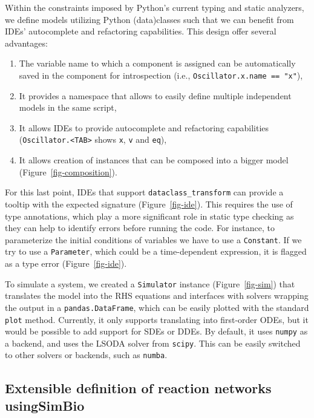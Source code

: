 \documentclass[namedate,numsec,webpdf,modern,large]{oup-authoring-template}
\theoremstyle{thmstyleone}%
\theoremstyle{thmstyletwo}%
\theoremstyle{thmstylethree}%
\begin{document}
Within the constraints imposed by Python's current typing and static analyzers,
we define models utilizing Python (data)classes
such that we can benefit from \acp{IDE}' autocomplete and refactoring capabilities.
This design offer several advantages:

\begin{enumerate}
\item
  The variable name to which a component is assigned can be automatically saved in the component for introspection
  (i.e., \texttt{Oscillator.x.name\ ==\ "x"}),
\item
  It provides a namespace that allows to easily define multiple independent models in the same script,
\item
  It allows \acp{IDE} to provide autocomplete and refactoring capabilities
  (\texttt{Oscillator.\textless{}TAB\textgreater{}} shows \texttt{x}, \texttt{v} and \texttt{eq}),
\item
  It allows creation of instances that can be composed into a bigger model (Figure~\ref{fig-composition}).
\end{enumerate}

For this last point,
\acp{IDE} that support \texttt{dataclass\_transform} \citep{debontePEP681Data2021}
can provide a tooltip with the expected signature (Figure~\ref{fig-ide}).
This requires the use of type annotations,
which play a more significant role in static type checking
as they can help to identify errors before running the code.
For instance, to parameterize the initial conditions of variables
we have to use a \texttt{Constant}.
If we try to use a \texttt{Parameter},
which could be a time-dependent expression,
it is flagged as a type error (Figure~\ref{fig-ide}).

To simulate a system,
we created a \texttt{Simulator} instance (Figure~\ref{fig-sim})
that translates the model into the \ac{RHS} equations
and interfaces with solvers
wrapping the output in a \texttt{pandas.DataFrame},
which can be easily plotted with the standard \texttt{plot} method.
Currently,
it only supports translating into first-order \acp{ODE},
but it would be possible to add support for \acp{SDE} or \acp{DDE}.
By default,
it uses \texttt{numpy} as a backend,
and uses the LSODA solver from \texttt{scipy}.
This can be easily switched to other solvers or backends, such as \texttt{numba}.

\subsection{Extensible definition of reaction networks usingSimBio}
\label{extensible-definition-of-reaction-networks-using-simbio}
\end{document}
